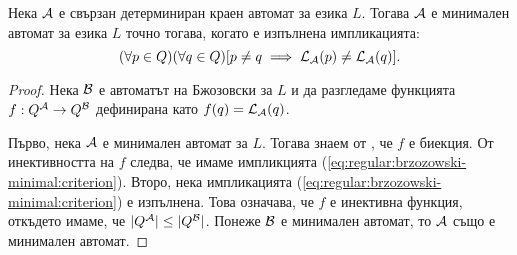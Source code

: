 \begin{framed}
  \begin{corollary}
    \label{cr:regular:brzozowski-minimal:criterion}
    Нека $\mathcal{A}$ е свързан детерминиран краен автомат за езика $L$.
    Тогава $\mathcal{A}$ е минимален автомат за езика $L$ точно тогава, когато е изпълнена импликацията:
    \begin{equation}
      \label{eq:regular:brzozowski-minimal:criterion}
      (\forall p\in Q)(\forall q\in Q)[p \neq q \implies \mathcal{L}_{\mathcal{A}}(p) \neq \mathcal{L}_{\mathcal{A}}(q)].
    \end{equation}
  \end{corollary}
\end{framed}
\begin{proof}
  Нека $\mathcal{B}$ е автоматът на Бжозовски за $L$
  и да разгледаме функцията $f : Q^{\mathcal{A}} \to Q^{\mathcal{B}}$ дефинирана като $f(q) = \mathcal{L}_{\mathcal{A}}(q)$.
  
  Първо, нека $\mathcal{A}$ е минимален автомат за $L$. Тогава знаем от , че
  $f$ е биекция. От инективността на $f$ следва, че имаме импликцията (\ref{eq:regular:brzozowski-minimal:criterion}).
  Второ, нека импликацията (\ref{eq:regular:brzozowski-minimal:criterion}) е изпълнена.
  Това означава, че $f$ е инективна функция, откъдето имаме, че $|Q^{\mathcal{A}}| \leq |Q^{\mathcal{B}}|$.
  Понеже $\mathcal{B}$ е минимален автомат, то $\mathcal{A}$ също е минимален автомат.  
\end{proof}



